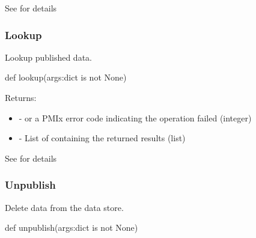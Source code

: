 See  for details


\subsubsection{Lookup}

\summary

Lookup published data.

\format

\pyspecificstart
\begin{codepar}
def lookup(args:dict is not None)
\end{codepar}
\pyspecificend

\begin{arglist}
\end{arglist}

Returns:
\begin{itemize}
    \item {} -  or a \ac{PMIx} error code indicating the operation failed (integer)
    \item {} - List of  containing the returned results (list)
\end{itemize}

See  for details


\subsubsection{Unpublish}

\summary

Delete data from the data store.

\format

\pyspecificstart
\begin{codepar}
def unpublish(args:dict is not None)
\end{codepar}
\pyspecificend

